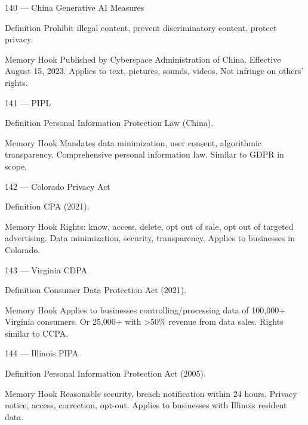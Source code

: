 \documentclass[aspectratio=169,8pt]{beamer}
\begin{document}
	\begin{frame}{140 --- China Generative AI Measures}
		\begin{block}{Definition}
			Prohibit illegal content, prevent discriminatory content, protect privacy.
		\end{block}
		\begin{block}{Memory Hook}
			Published by Cyberspace Administration of China. Effective August 15, 2023. Applies to text, pictures, sounds, videos. Not infringe on others' rights.
		\end{block}
	\end{frame}
	
	\begin{frame}{141 --- PIPL}
		\begin{block}{Definition}
			Personal Information Protection Law (China).
		\end{block}
		\begin{block}{Memory Hook}
			Mandates data minimization, user consent, algorithmic transparency. Comprehensive personal information law. Similar to GDPR in scope.
		\end{block}
	\end{frame}
	
	\begin{frame}{142 --- Colorado Privacy Act}
		\begin{block}{Definition}
			CPA (2021).
		\end{block}
		\begin{block}{Memory Hook}
			Rights: know, access, delete, opt out of sale, opt out of targeted advertising. Data minimization, security, transparency. Applies to businesses in Colorado.
		\end{block}
	\end{frame}
	
	\begin{frame}{143 --- Virginia CDPA}
		\begin{block}{Definition}
			Consumer Data Protection Act (2021).
		\end{block}
		\begin{block}{Memory Hook}
			Applies to businesses controlling/processing data of 100,000+ Virginia consumers. Or 25,000+ with >50\% revenue from data sales. Rights similar to CCPA.
		\end{block}
	\end{frame}
	
	\begin{frame}{144 --- Illinois PIPA}
		\begin{block}{Definition}
			Personal Information Protection Act (2005).
		\end{block}
		\begin{block}{Memory Hook}
			Reasonable security, breach notification within 24 hours. Privacy notice, access, correction, opt-out. Applies to businesses with Illinois resident data.
		\end{block}
	\end{frame}
	
\end{document}
